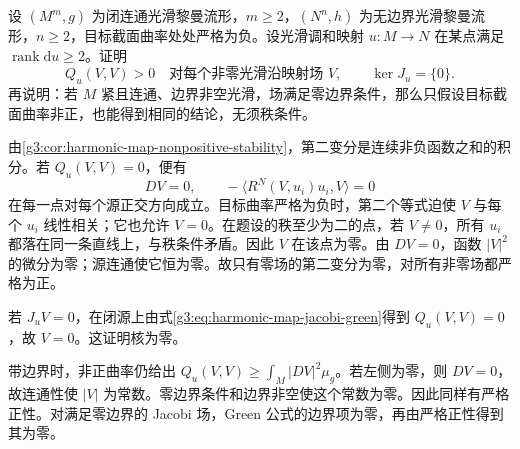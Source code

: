 \begin{exercise}\label{g3:ex:negative-target-jacobi-kernel}
	设 \((M^m,g)\) 为闭连通光滑黎曼流形，\(m\ge2\)，\((N^n,h)\) 为无边界光滑黎曼流形，\(n\ge2\)，目标截面曲率处处严格为负。设光滑调和映射 \(u:M\to N\) 在某点满足 \(\operatorname{rank}\mathrm du\ge2\)。证明
	\[
		Q_u(V,V)>0\quad\text{对每个非零光滑沿映射场 }V,
		\qquad \ker J_u=\{0\}.
	\]
	再说明：若 \(M\) 紧且连通、边界非空光滑，场满足零边界条件，那么只假设目标截面曲率非正，也能得到相同的结论，无须秩条件。
\end{exercise}
\begin{solution}
	由\cref{g3:cor:harmonic-map-nonpositive-stability}，第二变分是连续非负函数之和的积分。若 \(Q_u(V,V)=0\)，便有
	\[
		DV=0,\qquad
		-\langle R^N(V,u_i)u_i,V\rangle=0
	\]
	在每一点对每个源正交方向成立。目标曲率严格为负时，第二个等式迫使 \(V\) 与每个 \(u_i\) 线性相关；它也允许 \(V=0\)。在题设的秩至少为二的点，若 \(V\ne0\)，所有 \(u_i\) 都落在同一条直线上，与秩条件矛盾。因此 \(V\) 在该点为零。由 \(DV=0\)，函数 \(|V|^2\) 的微分为零；源连通使它恒为零。故只有零场的第二变分为零，对所有非零场都严格为正。

	若 \(J_uV=0\)，在闭源上由式\eqref{g3:eq:harmonic-map-jacobi-green}得到 \(Q_u(V,V)=0\)，故 \(V=0\)。这证明核为零。

	带边界时，非正曲率仍给出 \(Q_u(V,V)\ge\int_M|DV|^2\mu_g\)。若左侧为零，则 \(DV=0\)，故连通性使 \(|V|\) 为常数。零边界条件和边界非空使这个常数为零。因此同样有严格正性。对满足零边界的 Jacobi 场，Green 公式的边界项为零，再由严格正性得到其为零。
\end{solution}

